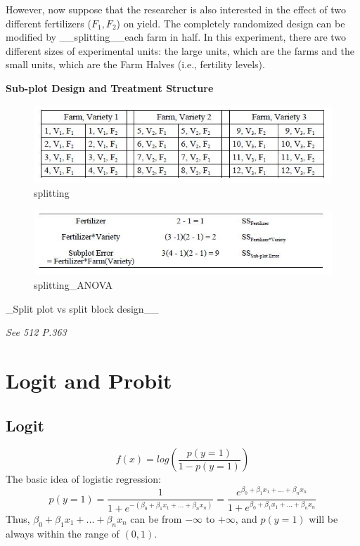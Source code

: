 \documentclass[]{book}
\begin{document}
However, now suppose that the researcher is also interested in the effect of two different fertilizers (\(F_1, F_2\)) on yield. The completely randomized design can be modified by \_\_splitting\_\_each farm in half. In this experiment, there are two different sizes of experimental units: the large units, which are the farms and the small units, which are the Farm Halves (i.e., fertility levels).

\textbf{Sub-plot Design and Treatment Structure}

\begin{figure}
\centering
\includegraphics{splitting.jpg}
\caption{splitting}
\end{figure}

\begin{figure}
\centering
\includegraphics{splitting_ANOVA.jpg}
\caption{splitting\_ANOVA}
\end{figure}

\_Split plot vs split block design\_\_

\emph{See 512 P.363}

\hypertarget{logit-and-probit}{%
\chapter{Logit and Probit}\label{logit-and-probit}}

\hypertarget{logit}{%
\section{Logit}\label{logit}}

\[f(x)=log(\frac{p(y=1)}{1-p(y=1)})\]
The basic idea of logistic regression:
\[p(y=1)=\frac{1}{1+e^{-(\beta_0+\beta_1x_1+...+\beta_nx_n)}}=\frac{e^{\beta_0+\beta_1x_1+...+\beta_nx_n}}{1+e^{\beta_0+\beta_1x_1+...+\beta_nx_n}}\]
Thus, \(\beta_0+\beta_1x_1+...+\beta_nx_n\) can be from \(-\infty\) to \(+\infty\), and \(p(y=1)\) will be always within the range of \((0,1)\).
\end{document}
